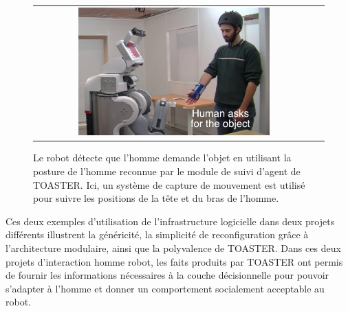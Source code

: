 \documentclass[a4paper,11pt,twoside]{StyleThese}
\begin{document}
 \begin{figure}[ht!]

 \centering
 \begin{tabular}{cc}
  \includegraphics[width=0.7\textwidth]{img/sapharishrink.png}
 \end{tabular}
 \caption{Le robot détecte que l'homme demande l'objet en utilisant la posture de l'homme reconnue par le module de suivi d'agent de TOASTER. Ici, un système de capture de mouvement est utilisé pour suivre les positions de la tête et du bras de l'homme.}
 \label{fig:saphari}
  \vspace{-15pt}
 \end{figure}
 
 
 Ces deux exemples d'utilisation de l'infrastructure logicielle dans deux projets différents illustrent la généricité, la simplicité de reconfiguration grâce à l'architecture modulaire, ainsi que la polyvalence de TOASTER. Dans ces deux projets d'interaction homme robot, les faits produits par TOASTER ont permis de fournir les informations nécessaires à la couche décisionnelle pour pouvoir s'adapter à l'homme et donner un comportement socialement acceptable au robot.

% 



\ifdefined{}
\else


\end{document}
